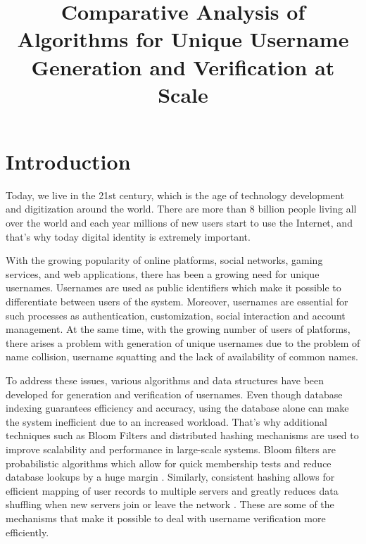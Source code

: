 \documentclass[conference]{IEEEtran}
\begin{document}
\title{Comparative Analysis of Algorithms for Unique Username Generation and Verification at Scale}

\author{
\and
{}
}

\maketitle


\section{Introduction}
Today, we live in the 21st century, which is the age of technology development and digitization around the world. There are more than 8 billion people living all over the world and each year millions of new users start to use the Internet, and that's why today digital identity is extremely important.

With the growing popularity of online platforms, social networks, gaming services, and web applications, there has been a growing need for unique usernames. Usernames are used as public identifiers which make it possible to differentiate between users of the system. Moreover, usernames are essential for such processes as authentication, customization, social interaction and account management. At the same time, with the growing number of users of platforms, there arises a problem with generation of unique usernames due to the problem of name collision, username squatting and the lack of availability of common names.

To address these issues, various algorithms and data structures have been developed for generation and verification of usernames. Even though database indexing guarantees efficiency and accuracy, using the database alone can make the system inefficient due to an increased workload. That's why additional techniques such as Bloom Filters and distributed hashing mechanisms are used to improve scalability and performance in large-scale systems. Bloom filters are probabilistic algorithms which allow for quick membership tests and reduce database lookups by a huge margin \cite{b1,b2}. Similarly, consistent hashing allows for efficient mapping of user records to multiple servers and greatly reduces data shuffling when new servers join or leave the network \cite{b3}. These are some of the mechanisms that make it possible to deal with username verification more efficiently.
\end{document}
